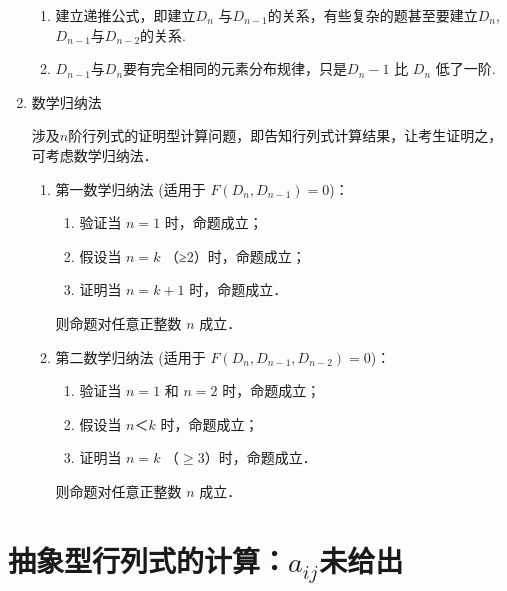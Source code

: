 \begin{enumerate}
          \begin{enumerate}
              \item 建立递推公式，即建立$D_n$ 与$D_{n-1}$的关系，有些复杂的题甚至要建立$D_n$,$D_{n-1}$与$D_{n-2}$的关系.
              \item$D_{n-1}$与$D_n$要有完全相同的元素分布规律，只是$D_n-1$ 比 $D_n$ 低了一阶.
          \end{enumerate}
    \item 数学归纳法
          \PThree

          涉及$n$阶行列式的证明型计算问题，即告知行列式计算结果，让考生证明之，可考虑数学归纳法．
          \begin{enumerate}
              \item 第一数学归纳法 (适用于 $F(D_{n},D_{n-1})=0$)：
                    \begin{enumerate}
                        \item 验证当 $n=1$ 时，命题成立；
                        \item 假设当 $n=k$ （≥2）时，命题成立；
                        \item 证明当 $n=k+1$ 时，命题成立．
                    \end{enumerate}
                    则命题对任意正整数 $n$ 成立．
              \item 第二数学归纳法 (适用于 $F(D_{n},D_{n-1},D_{n-2})=0$)：
                    \begin{enumerate}
                        \item 验证当 $n=1$ 和 $n=2$ 时，命题成立；
                        \item 假设当 $n＜k$ 时，命题成立；
                        \item 证明当 $n=k$ （$≥3$）时，命题成立．
                    \end{enumerate}
                    则命题对任意正整数 $n$ 成立．

          \end{enumerate}
\end{enumerate}
\section{抽象型行列式的计算：$a_{ij}$未给出}

